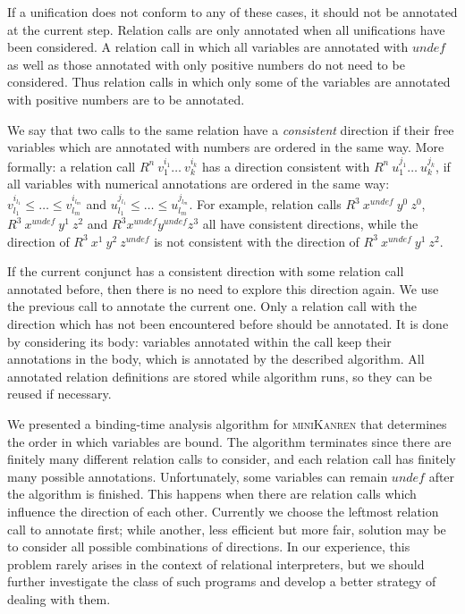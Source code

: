 \documentclass[submission,copyright,creativecommons]{eptcs}
\newcommand{\miniKanren}{\textsc{miniKanren}}
\newcommand\undef{unde\!f}
\begin{document}
If a unification does not conform to any of these cases, it should not be annotated at the current step.
Relation calls are only annotated when all unifications have been considered.
A relation call in which all variables are annotated with $\undef{}$ as well as those annotated with only positive numbers do not need to be considered.
Thus relation calls in which only some of the variables are annotated with positive numbers are to be annotated.

We say that two calls to the same relation have a \emph{consistent} direction if their free variables which are annotated with numbers are ordered in the same way.
More formally: a relation call $R^n \ v_1^{i_1} \dots \ v_k^{i_k}$ has a direction consistent with $R^n \ u_1^{j_1} \dots \ u_k^{j_k}$, if all variables with numerical annotations are ordered in the same way: $v_{l_1}^{i_{l_1}} \leq \dots \leq v_{l_m}^{i_{l_m}}$ and $u_{l_1}^{j_{l_1}} \leq \dots \leq u_{l_m}^{j_{l_m}}$. For example, relation calls $R^3 \ x^{\undef{}} \ y^{0} \ z^{0}$, $R^3 \ x^{\undef{}} \ y^{1} \ z^{2}$ and $R^3 x^{\undef{}} y^{\undef{}} z^{3}$ all have consistent directions, while the direction of $R^3 \ x^{1} \ y^{2} \ z^{\undef{}}$ is not consistent with the direction of $R^3 \ x^{\undef{}} \ y^{1} \ z^{2}$.

If the current conjunct has a consistent direction with some relation call annotated before, then there is no need to explore this direction again.
We use the previous call to annotate the current one.
Only a relation call with the direction which has not been encountered before should be annotated.
It is done by considering its body: variables annotated within the call keep their annotations in the body, which is annotated by the described algorithm.
All annotated relation definitions are stored while algorithm runs, so they can be reused if necessary.

We presented a binding-time analysis algorithm for \miniKanren{} that determines the order in which variables are bound.
The algorithm terminates since there are finitely many different relation calls to consider, and each relation call has finitely many possible annotations.
Unfortunately, some variables can remain $\undef{}$ after the algorithm is finished.
This happens when there are relation calls which influence the direction of each other.
Currently we choose the leftmost relation call to annotate first; while another, less efficient but more fair, solution may be to consider all possible combinations of directions.
In our experience, this problem rarely arises in the context of relational interpreters, but we should further investigate the class of such programs and develop a better strategy of dealing with them.



\nocite{*}


\end{document}

